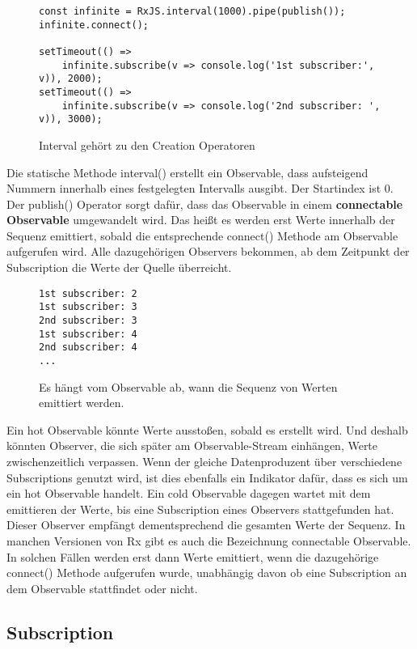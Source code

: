 \begin{figure}[H]
\begin{lstlisting}[basicstyle=\small]
const infinite = RxJS.interval(1000).pipe(publish());
infinite.connect();

setTimeout(() =>
    infinite.subscribe(v => console.log('1st subscriber:', v)), 2000);
setTimeout(() =>
    infinite.subscribe(v => console.log('2nd subscriber: ', v)), 3000);
\end{lstlisting}
\caption{Interval gehört zu den Creation Operatoren}
\label{interval-obs}
\end{figure}

\noindent
Die statische Methode interval() erstellt ein Observable, dass aufsteigend Nummern innerhalb eines festgelegten Intervalls ausgibt. Der Startindex ist 0. Der publish() Operator sorgt dafür, dass das Observable in einem \textbf{connectable Observable} umgewandelt wird. Das heißt es werden erst Werte innerhalb der Sequenz emittiert, sobald die entsprechende connect() Methode am Observable aufgerufen wird. Alle dazugehörigen Observers bekommen, ab dem Zeitpunkt der Subscription die Werte der Quelle überreicht.\\

\begin{figure}[H]
\begin{lstlisting}
1st subscriber: 2
1st subscriber: 3
2nd subscriber: 3
1st subscriber: 4
2nd subscriber: 4
...
\end{lstlisting}
\caption{Es hängt vom Observable ab, wann die Sequenz von Werten emittiert werden.}
\end{figure}

\noindent
Ein hot Observable könnte Werte ausstoßen, sobald es erstellt wird. Und deshalb könnten Observer, die sich später am Observable-Stream einhängen, Werte zwischenzeitlich verpassen. Wenn der gleiche Datenproduzent über verschiedene Subscriptions genutzt wird, ist dies ebenfalls ein Indikator dafür, dass es sich um ein hot Observable handelt. Ein cold Observable dagegen wartet mit dem emittieren der Werte, bis eine Subscription eines Observers stattgefunden hat. Dieser Observer empfängt dementsprechend die gesamten Werte der Sequenz. In manchen Versionen von Rx gibt es auch die Bezeichnung connectable Observable. In solchen Fällen werden erst dann Werte emittiert, wenn die dazugehörige connect() Methode aufgerufen wurde, unabhängig davon ob eine Subscription an dem Observable stattfindet oder nicht\cite{hot-vs-cold-part-2}.

\subsection{Subscription}

